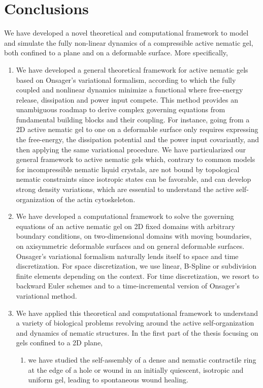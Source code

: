 \section{Conclusions}

We have developed a novel theoretical and computational framework to model
and simulate the fully non-linear dynamics of a compressible active nematic gel, both confined to a plane and on a deformable surface. More specifically,
\begin{enumerate}
	\item We have developed a general theoretical framework for active nematic gels based on Onsager's variational formalism, according to which the fully coupled and nonlinear dynamics minimize a functional where free-energy release, dissipation and power input compete. This method provides an unambiguous roadmap to derive complex governing equations from fundamental building blocks and their coupling. For instance, going from a 2D active nematic gel to one on a deformable surface only requires expressing the free-energy, the dissipation potential and the power input covariantly, and then applying the same variational procedure. We have particularized our general framework to active nematic gels which, contrary to common models for incompressible nematic liquid crystals, are not bound by topological nematic constraints since isotropic states can be favorable, and can develop strong density variations, which are essential to understand the active self-organization of the actin cytoskeleton. 
	\item We have developed a computational framework to solve the governing equations of an active nematic gel on 2D fixed domains with arbitrary boundary conditions, on two-dimensional domains with moving boundaries, on axisymmetric deformable  surfaces and on general deformable  surfaces. Onsager's variational formalism naturally lends itself to space and time discretization. For space discretization, we use linear, B-Spline or subdivision finite elements depending on the context. For time discretization, we resort to backward Euler schemes and to a time-incremental version of Onsager's variational method.
	\item We have applied this theoretical and computational framework to understand a variety of biological problems revolving around the active self-organization and dynamics of nematic structures.  In the first part of the thesis focusing on gels confined to a 2D plane, 
	\begin{enumerate}
	\item we have studied the self-assembly of a dense and nematic contractile ring at the edge of a hole or wound in an initially quiescent, isotropic and uniform gel, leading to spontaneous wound healing. 

\end{enumerate}
\end{enumerate}
